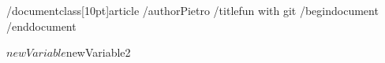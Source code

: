 /documentclass[10pt]{article}
/author{Pietro}
/title{fun with git}
/begin{document}
/end{document}


$newVariable
$newVariable2

